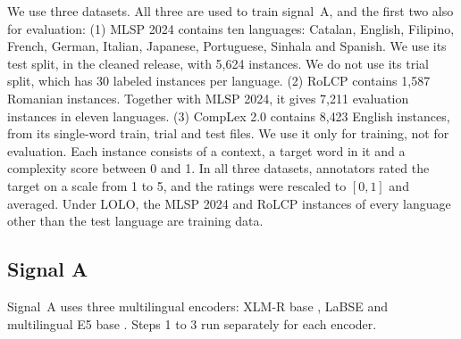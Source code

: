 \documentclass[11pt]{article}
\begin{document}
We use three datasets. All three are used to train signal~A, and the first two also for evaluation: %
(1) MLSP 2024 \citep{shardlow-etal-2024-bea,shardlow-etal-2024-extensible} contains ten languages: Catalan, English, Filipino,
French, German, Italian, Japanese, Portuguese, Sinhala and Spanish. We use its test split, in the
cleaned release, with 5{,}624 instances. We do not use its trial split, which has 30 labeled %
instances per language. %
(2) RoLCP \citep{anghel-etal-2025-rals} contains 1{,}587 Romanian instances. Together with MLSP %
2024, it gives 7{,}211 evaluation instances in eleven languages.
(3) CompLex 2.0 \citep{shardlow-etal-2021-semeval,shardlow-etal-2022-predicting} contains 8{,}423 English instances, from its %
single-word train, trial and test files. We use it only for training, not for evaluation. %
Each instance consists of a context, a target word in it and a complexity score between 0 and 1. %
In all three datasets, annotators rated the target on a scale from 1 to 5, and the ratings were %
rescaled to $[0, 1]$ and averaged. Under LOLO, the MLSP 2024 and RoLCP instances of every language %
other than the test language are training data.

\subsection{Signal A}
\label{sec:signal-a}

Signal~A uses three multilingual encoders: XLM-R base \citep{conneau2020xlmr}, LaBSE %
\citep{feng-etal-2022-language} and multilingual E5 base \citep{wang2024multilinguale5}. Steps 1 to
3 run separately for each encoder.
\end{document}
